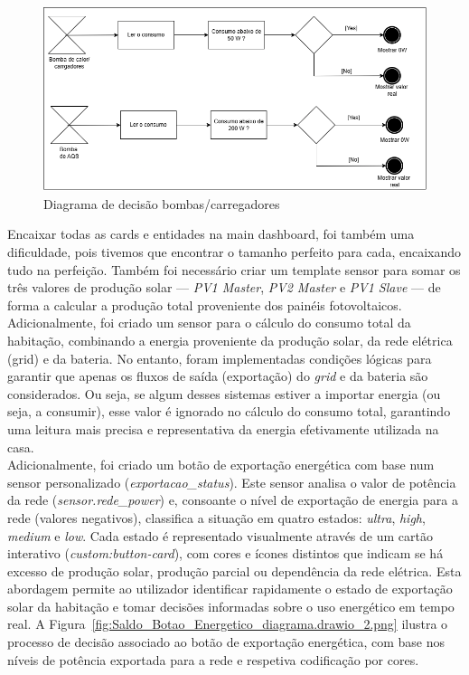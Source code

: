 \begin{figure}[H]
    \centering
    \includegraphics[width=\textwidth]{images/consumo_2.png}
    \caption{Diagrama de decisão bombas/carregadores}
    \label{fig:consumo_2.png}
\end{figure}

Encaixar todas as cards e entidades na main dashboard, foi também uma dificuldade, pois tivemos que encontrar o tamanho perfeito para cada, encaixando tudo na perfeição.
Também foi necessário criar um template sensor para somar os três valores de produção solar — \textit{PV1 Master}, \textit{PV2 Master} e \textit{PV1 Slave} — de forma a calcular a produção total proveniente dos painéis fotovoltaicos.\\
Adicionalmente, foi criado um sensor para o cálculo do consumo total da habitação, combinando a energia proveniente da produção solar, da rede elétrica (grid) e da bateria. No entanto, foram implementadas condições lógicas para garantir que apenas os fluxos de saída (exportação) do \textit{grid} e da bateria são considerados. Ou seja, se algum desses sistemas estiver a importar energia (ou seja, a consumir), esse valor é ignorado no cálculo do consumo total, garantindo uma leitura mais precisa e representativa da energia efetivamente utilizada na casa.\\
Adicionalmente, foi criado um botão de exportação energética com base num sensor personalizado (\textit{exportacao\_status}). Este sensor analisa o valor de potência da rede (\textit{sensor.rede\_power}) e, consoante o nível de exportação de energia para a rede (valores negativos), classifica a situação em quatro estados: \textit{ultra}, \textit{high}, \textit{medium} e \textit{low}.
Cada estado é representado visualmente através de um cartão interativo (\textit{custom:button-card}), com cores e ícones distintos que indicam se há excesso de produção solar, produção parcial ou dependência da rede elétrica. Esta abordagem permite ao utilizador identificar rapidamente o estado de exportação solar da habitação e tomar decisões informadas sobre o uso energético em tempo real. A Figura~\ref{fig:Saldo_Botao_Energetico_diagrama.drawio_2.png} ilustra o processo de decisão associado ao botão de exportação energética, com base nos níveis de potência exportada para a rede e respetiva codificação por cores.

